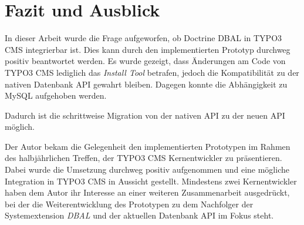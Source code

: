 \chapter{Fazit und Ausblick}
\label{ch:conclusion}
In dieser Arbeit wurde die Frage aufgeworfen, ob Doctrine DBAL in TYPO3 CMS integrierbar ist. Dies kann durch den implementierten Prototyp durchweg positiv beantwortet werden. Es wurde gezeigt, dass Änderungen am Code von TYPO3 CMS lediglich das \textit{Install Tool} betrafen, jedoch die Kompatibilität zu der nativen Datenbank API gewahrt bleiben. Dagegen konnte die Abhängigkeit zu MySQL aufgehoben werden.

Dadurch ist die schrittweise Migration von der nativen API zu der neuen API möglich.

Der Autor bekam die Gelegenheit den implementierten Prototypen im Rahmen des halbjährlichen Treffen, der TYPO3 CMS Kernentwickler zu präsentieren. Dabei wurde die Umsetzung durchweg positiv aufgenommen und eine mögliche Integration in TYPO3 CMS in Aussicht gestellt. Mindestens zwei Kernentwickler haben dem Autor ihr Interesse an einer weiteren Zusammenarbeit ausgedrückt, bei der die Weiterentwicklung des Prototypen zu dem Nachfolger der Systemextension \textit{DBAL} und der aktuellen Datenbank API im Fokus steht.

